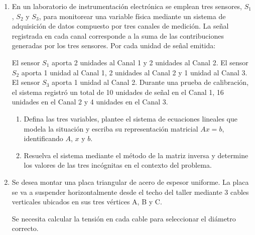 \documentclass[11pt,a4paper]{article}
\begin{document}
\begin{enumerate}
Después de realizar la mezcla, el laboratorio de control
de calidad determinó que la solución obtenida contiene
exactamente 9 unidades de la sustancia A,
6 unidades de la sustancia B y 6 unidades de la sustancia C.

\begin{enumerate}
\item Defina las tres variables, plantee el sistema de ecuaciones
lineales que modela la situación y escriba su representación
matricial $Ax=b$, identificando $A$, $x$ y $b$.

\item Resuelva el sistema mediante la regla de Cramer y determine los valores de las tres incógnitas
en el contexto del problema.
\end{enumerate}

\item En un laboratorio de instrumentación electrónica se
emplean tres sensores, $S_1$, $S_2$ y $S_3$, para monitorear
una variable física mediante un sistema de adquisición de
datos compuesto por tres canales de medición. La señal registrada en cada canal corresponde a la suma de las contribuciones generadas por los tres sensores.
Por cada unidad de señal emitida:

El sensor $S_1$ aporta 2 unidades al Canal 1
y 2 unidades al Canal 2. El sensor $S_2$ aporta 1 unidad al Canal 1,
2 unidades al Canal 2 y 1 unidad al Canal 3. El sensor $S_3$ aporta 1 unidad al Canal 2. Durante una prueba de calibración, el sistema registró
un total de 10 unidades de señal en el Canal 1,
16 unidades en el Canal 2 y 4 unidades en el Canal 3.

\begin{enumerate}
\item Defina las tres variables, plantee el sistema de ecuaciones
lineales que modela la situación y escriba su representación
matricial $Ax=b$, identificando $A$, $x$ y $b$.

\item Resuelva el sistema mediante el método de la matriz inversa y determine los valores de las tres
incógnitas en el contexto del problema.
\end{enumerate}

\item Se desea montar una placa triangular de acero de
espesor uniforme. La placa se va a suspender horizontalmente
desde el techo del taller mediante 3 cables verticales
ubicados en sus tres vértices A, B y C.

Se necesita calcular la tensión en cada cable para
seleccionar el diámetro correcto.


\end{enumerate}
\end{document}
